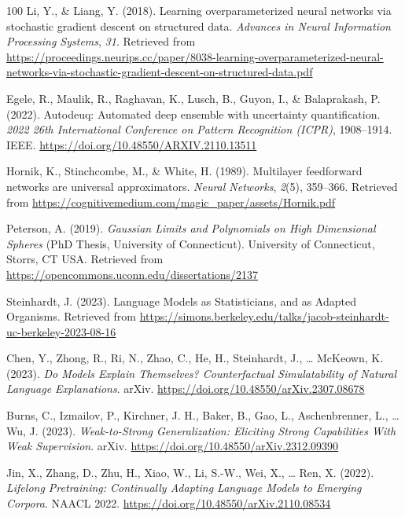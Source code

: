 \documentclass[11pt]{book}
\begin{document}
\begin{thebibliography}{100}
 Li, Y., \& Liang, Y. (2018). Learning overparameterized neural networks
via stochastic gradient descent on structured data. \emph{Advances in
Neural Information Processing Systems}, \emph{31}. Retrieved from
\url{https://proceedings.neurips.cc/paper/8038-learning-overparameterized-neural-networks-via-stochastic-gradient-descent-on-structured-data.pdf}

 Egele, R., Maulik, R., Raghavan, K., Lusch, B., Guyon, I., \&
Balaprakash, P. (2022). Autodeuq: Automated deep ensemble with
uncertainty quantification. \emph{2022 26th International Conference on
Pattern Recognition (ICPR)}, 1908--1914. IEEE.
\url{https://doi.org/10.48550/ARXIV.2110.13511}

 Hornik, K., Stinchcombe, M., \& White, H. (1989). Multilayer feedforward
networks are universal approximators. \emph{Neural Networks},
\emph{2}(5), 359--366. Retrieved from
\url{https://cognitivemedium.com/magic_paper/assets/Hornik.pdf}

 Peterson, A. (2019). \emph{Gaussian Limits and Polynomials on High
Dimensional Spheres} (PhD Thesis, University of Connecticut). University
of Connecticut, Storrs, CT USA. Retrieved from
\url{https://opencommons.uconn.edu/dissertations/2137}

 Steinhardt, J. (2023). Language Models as Statisticians, and as Adapted
Organisms. Retrieved from
\url{https://simons.berkeley.edu/talks/jacob-steinhardt-uc-berkeley-2023-08-16}

 Chen, Y., Zhong, R., Ri, N., Zhao, C., He, H., Steinhardt, J., \ldots{}
McKeown, K. (2023). \emph{Do Models Explain Themselves? Counterfactual
Simulatability of Natural Language Explanations}. arXiv.
\url{https://doi.org/10.48550/arXiv.2307.08678}

 Burns, C., Izmailov, P., Kirchner, J. H., Baker, B., Gao, L.,
Aschenbrenner, L., \ldots{} Wu, J. (2023). \emph{Weak-to-Strong
Generalization: Eliciting Strong Capabilities With Weak Supervision}.
arXiv. \url{https://doi.org/10.48550/arXiv.2312.09390}

 Jin, X., Zhang, D., Zhu, H., Xiao, W., Li, S.-W., Wei, X., \ldots{} Ren,
X. (2022). \emph{Lifelong Pretraining: Continually Adapting Language
Models to Emerging Corpora}. NAACL 2022.
\url{https://doi.org/10.48550/arXiv.2110.08534}


\end{thebibliography}
\end{document}
